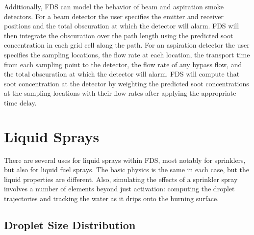 \documentclass[11pt]{book}
\begin{document}
Additionally, FDS can model the behavior of beam and aspiration smoke detectors.  For a beam detector the user
specifies the emitter and receiver positions and the total obscuration at which the detector will alarm.  FDS will then
integrate the obscuration over the path length using the predicted soot concentration in each grid cell along
the path.  For an aspiration detector the user specifies the sampling locations, the flow rate at each location, the
transport time from each sampling point to the detector, the flow rate of any bypass flow, and the total obscuration at which the
detector will alarm.  FDS will compute that soot concentration at the detector by weighting the predicted soot concentrations
at the sampling locations with their flow rates after applying the appropriate time delay.





\clearpage
\section{Liquid Sprays}

There are several uses for liquid sprays within FDS, most notably for sprinklers, but also for liquid fuel sprays. The basic physics is the
same in each case, but the liquid properties are different.
Also, simulating the effects of a sprinkler spray involves a number of
elements beyond just activation: computing the droplet trajectories and
tracking the water as it drips onto the burning surface.



\subsection{Droplet Size Distribution}
\end{document}
